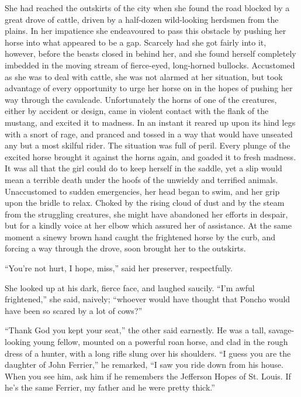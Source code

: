 \documentclass[12pt]{book}
\begin{document}
She had reached the outskirts of the city when she found the road blocked by a great drove of cattle, driven by a half-dozen wild-looking herdsmen from the plains. In her impatience she endeavoured to pass this obstacle by pushing her horse into what appeared to be a gap. Scarcely had she got fairly into it, however, before the beasts closed in behind her, and she found herself completely imbedded in the moving stream of fierce-eyed, long-horned bullocks. Accustomed as she was to deal with cattle, she was not alarmed at her situation, but took advantage of every opportunity to urge her horse on in the hopes of pushing her way through the cavalcade. Unfortunately the horns of one of the creatures, either by accident or design, came in violent contact with the flank of the mustang, and excited it to madness. In an instant it reared up upon its hind legs with a snort of rage, and pranced and tossed in a way that would have unseated any but a most skilful rider. The situation was full of peril. Every plunge of the excited horse brought it against the horns again, and goaded it to fresh madness. It was all that the girl could do to keep herself in the saddle, yet a slip would mean a terrible death under the hoofs of the unwieldy and terrified animals. Unaccustomed to sudden emergencies, her head began to swim, and her grip upon the bridle to relax. Choked by the rising cloud of dust and by the steam from the struggling creatures, she might have abandoned her efforts in despair, but for a kindly voice at her elbow which assured her of assistance. At the same moment a sinewy brown hand caught the frightened horse by the curb, and forcing a way through the drove, soon brought her to the outskirts. 

“You’re not hurt, I hope, miss,” said her preserver, respectfully. 

She looked up at his dark, fierce face, and laughed saucily. “I’m awful frightened,” she said, naively; “whoever would have thought that Poncho would have been so scared by a lot of cows?” 

“Thank God you kept your seat,” the other said earnestly. He was a tall, savage-looking young fellow, mounted on a powerful roan horse, and clad in the rough dress of a hunter, with a long rifle slung over his shoulders. “I guess you are the daughter of John Ferrier,” he remarked, “I saw you ride down from his house. When you see him, ask him if he remembers the Jefferson Hopes of St. Louis. If he’s the same Ferrier, my father and he were pretty thick.” 
\end{document}
